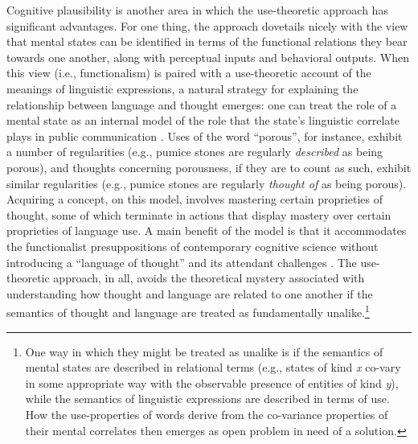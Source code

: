 Cognitive plausibility is another area in which the use-theoretic approach has significant advantages. For one thing, the approach dovetails nicely with the view that mental states can be identified in terms of the functional relations they bear towards one another, along with perceptual inputs and behavioral outputs. When this view (i.e., functionalism) is paired with a use-theoretic account of the meanings of linguistic expressions, a natural strategy for explaining the relationship between language and thought emerges: one can treat the role of a mental state as an internal model of the role that the state's linguistic correlate plays in public communication \citep{Block:1986}. Uses of the word ``porous'', for instance, exhibit a number of regularities (e.g., pumice stones are regularly \textit{described} as being porous), and thoughts concerning porousness, if they are to count as such, exhibit similar regularities (e.g., pumice stones are regularly \textit{thought of} as being porous). Acquiring a concept, on this model, involves mastering certain proprieties of thought, some of which terminate in actions that display mastery over certain proprieties of language use. A main benefit of the model is that it accommodates the functionalist presuppositions of contemporary cognitive science \citep{Fodor:1998} without introducing a ``language of thought'' and its attendant challenges \citep[see e.g.,][]{Dennett:1987}. The use-theoretic approach, in all, avoids the theoretical mystery associated with understanding how thought and language are related to one another if the semantics of thought and language are treated as fundamentally unalike.\footnote{One way in which they might be treated as unalike is if the semantics of mental states are described in relational terms (e.g., states of kind \textit{x} co-vary in some appropriate way with the observable presence of entities of kind \textit{y}), while the semantics of linguistic expressions are described in terms of use. How the use-properties of words derive from the co-variance properties of their mental correlates then emerges as open problem in need of a solution.}

